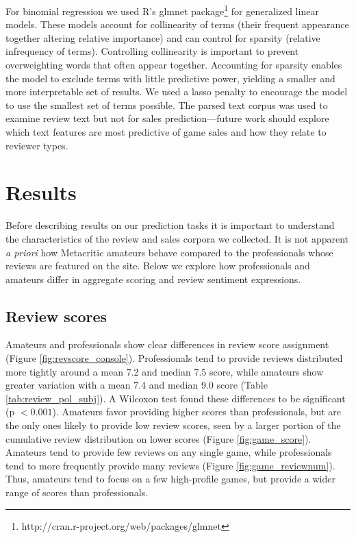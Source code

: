 \documentclass[letterpaper]{article}
\begin{document}
For binomial regression we used R's glmnet package\footnote{http://cran.r-project.org/web/packages/glmnet} for generalized linear models. These models account for collinearity of terms (their frequent appearance together altering relative importance) and can control for sparsity (relative infrequency of terms). Controlling collinearity is important to prevent overweighting words that often appear together. Accounting for sparsity enables the model to exclude terms with little predictive power, yielding a smaller and more interpretable set of results. We used a lasso penalty to encourage the model to use the smallest set of terms possible. The parsed text corpus was used to examine review text but not for sales prediction---future work should explore which text features are most predictive of game sales and how they relate to reviewer types.



\section{Results}
Before describing results on our prediction tasks it is important to understand the characteristics of the review and sales corpora we collected. It is not apparent \textit{a priori} how Metacritic amateurs behave compared to the professionals whose reviews are featured on the site. Below we explore how professionals and amateurs differ in aggregate scoring and review sentiment expressions.

\subsection{Review scores}
Amateurs and professionals show clear differences in review score assignment (Figure \ref{fig:revscore_console}). Professionals tend to provide reviews distributed more tightly around a mean 7.2 and median 7.5 score, while amateurs show greater variation with a mean 7.4 and median 9.0 score (Table \ref{tab:review_pol_subj}). A Wilcoxon test found these differences to be significant (p $< 0.001$). Amateurs favor providing higher scores than professionals, but are the only ones likely to provide low review scores, seen by a larger portion of the cumulative review distribution on lower scores (Figure \ref{fig:game_score}). Amateurs tend to provide few reviews on any single game, while professionals tend to more frequently provide many reviews (Figure \ref{fig:game_reviewnum}). Thus, amateurs tend to focus on a few high-profile games, but provide a wider range of scores than professionals. 
\end{document}
